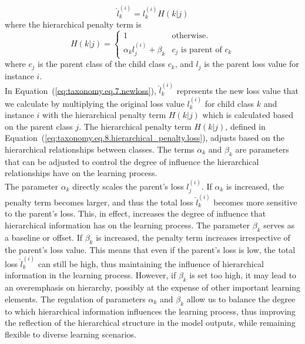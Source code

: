 \documentclass[authoryear,preprint,review,12pt]{elsarticle}
\begin{document}
\begin{equation}
    \label{eq:taxonomy.eq.7.newloss}
    \widehat{l}_k^{(i)} = l_k^{(i)} H( k \vert j)
\end{equation}
where the hierarchical penalty term is
\begin{equation}
    \label{eq:taxonomy.eq.8.hierarchical_penalty.loss}
    H(k \vert j) =
    \left\{ \begin{array}{ll}
    1 & \text{otherwise.}
    \\
    \alpha_k l_j^{(i)} + \beta_k & c_j \text{ is parent of } c_k
    \end{array} \right.
\end{equation}
where $c_j$ is the parent class of the child class $c_k$, and $l_j$ is the parent loss value for instance $i$. \\

In Equation~(\ref{eq:taxonomy.eq.7.newloss}), $\widehat{l}_k^{(i)}$ represents the new loss value that we calculate by multiplying the original loss value $l_k^{(i)}$ for child class $k$ and instance $i$ with the hierarchical penalty term $H(k \vert j)$ which is calculated based on the parent class $j$. The hierarchical penalty term $H(k \vert j)$, defined in Equation~(\ref{eq:taxonomy.eq.8.hierarchical_penalty.loss}), adjusts based on the hierarchical relationships between classes. The terms $\alpha _k$ and $\beta_k$ are parameters that can be adjusted to control the degree of influence the hierarchical relationships have on the learning process.
\\ %
The parameter $\alpha _k$ directly scales the parent's loss $l_j^{(i)}$. If $\alpha _k$ is increased, the penalty term becomes larger, and thus the total loss $\widehat{l}_k^{(i)}$ becomes more sensitive to the parent's loss. This, in effect, increases the degree of influence that hierarchical information has on the learning process. The parameter $\beta_k$ serves as a baseline or offset. If $\beta_k$ is increased, the penalty term increases irrespective of the parent's loss value. This means that even if the parent's loss is low, the total loss $\widehat{l}_k^{(i)}$ can still be high, thus maintaining the influence of hierarchical information in the learning process. However, if $\beta_k$ is set too high, it may lead to an overemphasis on hierarchy, possibly at the expense of other important learning elements. The regulation of parameters $\alpha_k$ and $\beta_k$ allow us to balance the degree to which hierarchical information influences the learning process, thus improving the reflection of the hierarchical structure in the model outputs, while remaining flexible to diverse learning scenarios.
%
\end{document}
